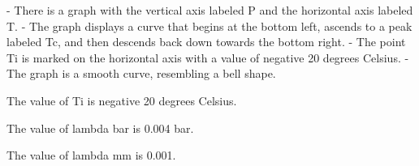 - There is a graph with the vertical axis labeled P and the horizontal axis labeled T.
- The graph displays a curve that begins at the bottom left, ascends to a peak labeled Tc, and then descends back down towards the bottom right.
- The point Ti is marked on the horizontal axis with a value of negative 20 degrees Celsius.
- The graph is a smooth curve, resembling a bell shape.

The value of Ti is negative 20 degrees Celsius.

The value of lambda bar is 0.004 bar.

The value of lambda mm is 0.001.